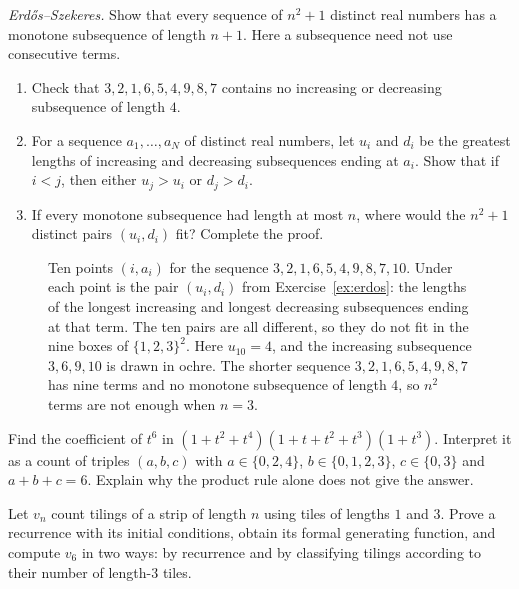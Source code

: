 \begin{exercise}[$\star\star$]\label{ex:erdos}
\emph{Erd\H{o}s--Szekeres.} Show that every sequence of $n^2+1$
distinct real numbers has a monotone subsequence of length $n+1$.
Here a subsequence need not use consecutive terms.
\begin{enumerate}[label=(\alph*)]
\item Check that $3,2,1,6,5,4,9,8,7$ contains no increasing
or decreasing subsequence of length $4$.
\item For a sequence $a_1,\dots,a_N$ of distinct real numbers, let
$u_i$ and $d_i$ be the greatest lengths of increasing and decreasing
subsequences ending at $a_i$. Show that if $i<j$, then either
$u_j>u_i$ or $d_j>d_i$.
\item If every monotone subsequence had length at most $n$,
where would the $n^2+1$ distinct pairs $(u_i,d_i)$ fit?
Complete the proof.
\end{enumerate}
\end{exercise}
\begin{figure}[ht]
\centering
{}
\caption{Ten points $(i,a_i)$ for the sequence $3,2,1,6,5,4,9,8,7,10$. Under each point is the pair $(u_i,d_i)$ from Exercise~\ref{ex:erdos}: the lengths of the longest increasing and longest decreasing subsequences ending at that term. The ten pairs are all different, so they do not fit in the nine boxes of $\{1,2,3\}^2$. Here $u_{10}=4$, and the increasing subsequence $3,6,9,10$ is drawn in ochre. The shorter sequence $3,2,1,6,5,4,9,8,7$ has nine terms and no monotone subsequence of length $4$, so $n^2$ terms are not enough when $n=3$.}
\label{fig:erdos}
\end{figure}

\begin{exercise}[$\star$]\label{ex:count-coefficient}
Find the coefficient of $t^6$ in $(1+t^2+t^4)(1+t+t^2+t^3)(1+t^3)$. Interpret it as a count of triples $(a,b,c)$ with $a\in\{0,2,4\}$, $b\in\{0,1,2,3\}$, $c\in\{0,3\}$ and $a+b+c=6$. Explain why the product rule alone does not give the answer.
\end{exercise}

\begin{exercise}[$\star\star$]\label{ex:count-tiles}
Let $v_n$ count tilings of a strip of length $n$ using tiles of lengths $1$ and $3$. Prove a recurrence with its initial conditions, obtain its formal generating function, and compute $v_6$ in two ways: by recurrence and by classifying tilings according to their number of length-$3$ tiles.
\end{exercise}

